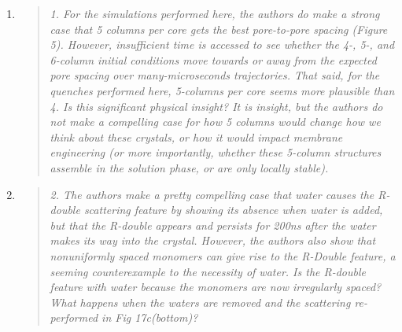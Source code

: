 \documentclass{article}
\begin{document}
\begin{enumerate}
\begin{quote}
	
	\end{quote}
	
	\item \begin{quote}
    \textit{1. For the simulations performed here, the authors do make a strong case that 5 columns per
    core gets the best pore-to-pore spacing (Figure 5). However, insufficient time is accessed to see 
    whether the 4-, 5-, and 6-column initial conditions move towards or away from the expected pore 
    spacing over many-microseconds trajectories. That said, for the quenches performed here, 5-columns
    per core seems more plausible than 4. Is this significant physical insight? It is insight, but the
    authors do not make a compelling case for how 5 columns would change how we think about these crystals,
    or how it would impact membrane engineering (or more importantly, whether these 5-column structures
    assemble in the solution phase, or are only locally stable).}
    
    
    \end{quote}
    
    \item \begin{quote}
    \textit{2. The authors make a pretty compelling case that water causes the R-double scattering feature
    by showing its absence when water is added, but that the R-double appears and persists for 200ns after
    the water makes its way into the crystal. However, the authors also show that nonuniformly spaced
    monomers can give rise to the R-Double feature, a seeming counterexample to the necessity of water.
    Is the R-double feature with water because the monomers are now irregularly spaced? What happens when
    the waters are removed and the scattering re-performed in Fig 17c(bottom)?}
    \end{quote}
    

\end{enumerate}
\end{document}
